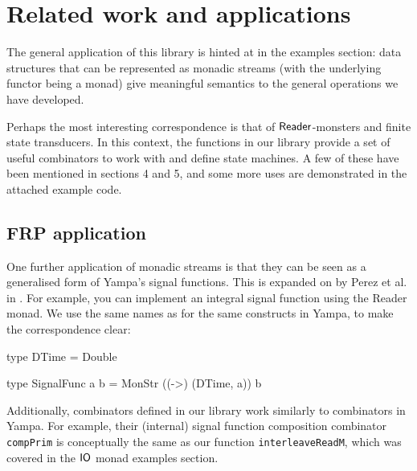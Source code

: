 
\section{Related work and applications}

The general application of this library is hinted at in the examples section: data structures that can be represented as monadic streams (with the underlying functor being a monad) give meaningful semantics to the general operations we have developed.

Perhaps the most interesting correspondence is that of $\mathsf{Reader}$-monsters and finite state transducers. In this context, the functions in our library provide a set of useful combinators to work with and define state machines. A few of these have been mentioned in sections 4 and 5, and some more uses are demonstrated in the attached example code.

\subsection{FRP application}

One further application of monadic streams is that they can be seen as a generalised form of Yampa's \cite{yampa_arcade} signal functions. This is expanded on by Perez et al. in \cite{frp_refactored}. For example, you can implement an integral signal function using the Reader monad. We use the same names as for the same constructs in Yampa, to make the correspondence clear:

\begin{haskell}
type DTime = Double

type SignalFunc a b = MonStr ((->) (DTime, a)) b
\end{haskell}


Additionally, combinators defined in our library work similarly to combinators in Yampa. For example, their (internal) signal function composition combinator \verb+compPrim+ is conceptually the same as our function \verb+interleaveReadM+, which was covered in the $\mathsf{IO}$ monad examples section.

